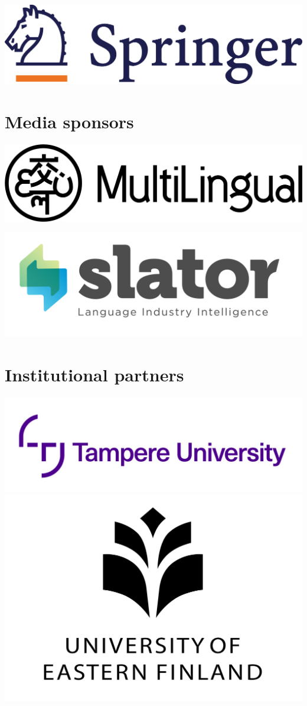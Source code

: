 \documentclass[a4paper,11pt,twoside]{book}
\begin{document}
\begin{center}
\includegraphics[width=0.55\columnwidth]{logos/springer-logo.png}
\end{center}

\vfill

\section*{Media sponsors}

\begin{center}
\includegraphics[width=0.6\columnwidth]{logos/multilingual-logo.png}

\vfill

\includegraphics[width=0.6\columnwidth]{logos/slator-logo.png}
\thispagestyle{empty}
\end{center}

\vfill

\section*{Institutional partners}

\begin{center}
\vfill
\includegraphics[width=0.6\columnwidth]{logos/tau-logo.jpg}\\
\vfill
\includegraphics[width=0.6\columnwidth]{logos/uef-logo.jpg}
\vfill
\end{center}
\thispagestyle{empty}
\end{document}
